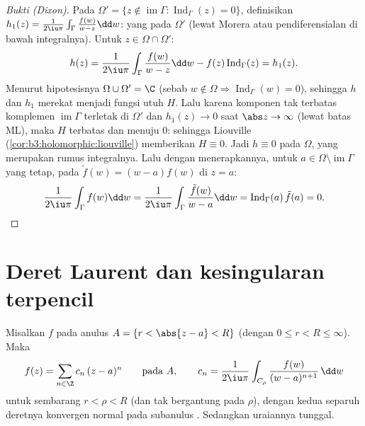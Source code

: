\begin{proof}[Bukti (Dixon)]
Pada  $\Omega' = \{z \notin \operatorname{im}\Gamma
: \operatorname{Ind}_\Gamma(z) = 0\}$, definisikan $h_1(z) =
\frac1{2\iu\pi}\int_\Gamma\frac{f(w)}{w - z}\dd w$: yang
 pada $\Omega'$ (lewat Morera atau pendiferensialan di bawah
integralnya). Untuk $z \in \Omega\cap\Omega'$:
\[
h(z) = \frac1{2\iu\pi}\int_\Gamma\frac{f(w)}{w-z}\dd w
- f(z)\operatorname{Ind}_\Gamma(z) = h_1(z) .
\]
Menurut hipotesisnya $\Omega\cup\Omega' = \C$ (sebab $w \notin \Omega
\Rightarrow \operatorname{Ind}_\Gamma(w) = 0$), sehingga $h$ dan
$h_1$ merekat menjadi fungsi utuh $H$. Lalu karena komponen tak terbatas
komplemen $\operatorname{im}\Gamma$ terletak
di $\Omega'$ dan $h_1(z) \to 0$ saat $\abs z \to \infty$ (lewat batas
ML), maka $H$ terbatas dan menuju $0$: sehingga Liouville
(\cref{cor:b3:holomorphic:liouville}) memberikan $H \equiv 0$. Jadi
$h \equiv 0$ pada $\Omega$, yang merupakan rumus integralnya.
Lalu dengan menerapkannya, untuk $a \in
\Omega\setminus\operatorname{im}\Gamma$ yang tetap, pada $\tilde f(w) =
(w - a)f(w)$ di $z = a$:
\[
\frac1{2\iu\pi}\int_\Gamma f(w)\dd w =
\frac1{2\iu\pi}\int_\Gamma \frac{\tilde f(w)}{w - a}\dd w =
\operatorname{Ind}_\Gamma(a)\,\tilde f(a) = 0 .
\]
\end{proof}

\section{Deret Laurent dan kesingularan terpencil}

\begin{theorem}\label{thm:b3:residues:laurent}
Misalkan $f$  pada anulus $A = \{r < \abs{z - a} <
R\}$ (dengan $0 \leq r < R \leq \infty$). Maka
\[
f(z) = \sum_{n\in\Z}c_n\,(z - a)^n
\qquad\text{pada } A,
\qquad
c_n = \frac1{2\iu\pi}\int_{C_\rho}\frac{f(w)}{(w -
a)^{n+1}}\,\dd w
\]
untuk sembarang $r < \rho < R$ (dan tak bergantung pada $\rho$), dengan kedua
separuh deretnya konvergen normal pada subanulus . Sedangkan
uraiannya tunggal.
\end{theorem}

